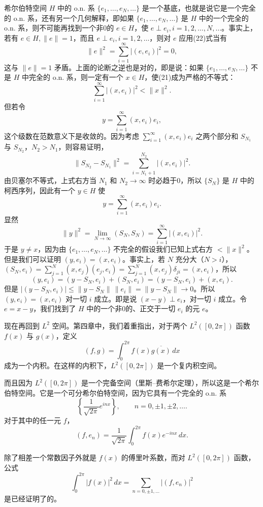 希尔伯特空间 $H$ 中的 o.n. 系 $\{e_1,\ldots,e_N,\ldots\}$ 是一个基底，也就是说它是一个完全的 o.n. 系，还有另一个几何解释，即如果 $\{e_1,\ldots,e_N,\ldots\}$ 是 $H$ 中的一个完全的 o.n. 系，则不可能再找到一个非0的 $e\in H$，使 $e\perp e_i,i=1,2,\ldots,N,\ldots$。事实上，若有 $e\in H,\|e\|=1$，而且 $e\perp e_i,i=1,2,\ldots$，则对 $e$ 应用(22)式当有
\[
 \|e\|^2=\sum_{i=1}^\infty |(e,e_i)|^2=0,
\]
这与 $\|e\|=1$ 矛盾。上面的论断之逆也是对的，即是说：如果 $\{e_1,\ldots,e_N,\ldots\}$ 不是 $H$ 中完全的 o.n. 系，则一定有一个 $x\in H$，使(21)成为严格的不等式：
\[
 \sum_{i=1}^\infty |(x,e_i)|^2<\|x\|^2.
\]
但若令
\[
 y=\sum_{i=1}^\infty(x,e_i)e_i,
\]
这个级数在范数意义下是收敛的。因为考虑 $\sum_{i=1}^\infty(x,e_i)e_i$ 之两个部分和 $S_{N_1}$ 与 $S_{N_2}$，$N_2>N_1$，则容易证明，
\[
 \|S_{N_2}-S_{N_1}\|^2=\sum_{i=N_1+1}^{N_2}|(x,e_i)|^2.
\]
由贝塞尔不等式，上式右方当 $N_1$ 和 $N_2\to\infty$ 时必趋于0，所以 $\{S_N\}$ 是 $H$ 中的柯西序列，因此有一个 $y\in H$ 使
\[
 y=\sum_{i=1}^\infty(x,e_i)e_i.
\]
显然
\[
 \|y\|^2=\lim_{N\to\infty}(S_N,S_N)=\sum_{i=1}^\infty|(x,e_i)|^2.
\]
于是 $y\ne x$，因为由 $\{e_1,\ldots,e_N,\ldots\}$ 不完全的假设我们已知上式右方 $<\|x\|^2$。但是我们可以证明 $(y,e_i)=(x,e_i)$。事实上，若 $N$ 充分大（$N>i$），$(S_N,e_i)=\sum_{j=1}^N(x,e_j)(e_j,e_i)=\sum_{j=1}^N(x,e_j)\delta_{ji}=(x,e_i)$，所以
\[
 (y,e_i)=(y-S_N,e_i)+(S_N,e_i)=(y-S_N,e_i)+(x,e_i).
\]
但是 $|(y-S_N,e_i)|\le\|y-S_N\|\,\|e_i\|=\|y-S_N\|\to0$。所以 $(y,e_i)=(x,e_i)$ 对一切 $i$ 成立。即是说 $(x-y)\perp e_i$，对一切 $i$ 成立。令 $e=x-y$，我们找到了 $H$ 中的一个非0的、正交于一切 $e_i$ 的元 $e$。

现在再回到 $L^2$ 空间。第四章中，我们着重指出，对于两个 $L^2([0,2\pi])$ 函数 $f(x)$ 与 $g(x)$，定义
\begin{equation}
 (f,g)=\int_0^{2\pi}f(x)\overline{g(x)}\,dx
 \tag{23}
\end{equation}
成为一个内积。在这样的内积下，$L^2([0,2\pi])$ 是一个复内积空间。

而且因为 $L^2([0,2\pi])$ 是一个完备空间（里斯--费希尔定理），所以这是一个希尔伯特空间。它是一个可分希尔伯特空间，因为它具有一个完全的 o.n. 系
\[
 \left\{\frac1{\sqrt{2\pi}}e^{inx}\right\},\qquad n=0,\pm1,\pm2,\ldots.
\]
对于其中的任一元 $f$，
\[
 (f,e_n)=\frac1{\sqrt{2\pi}}\int_0^{2\pi}f(x)e^{-inx}\,dx.
\]

除了相差一个常数因子外就是 $f(x)$ 的傅里叶系数，而对 $L^2([0,2\pi])$ 函数，公式
\[
 \int_0^{2\pi}|f(x)|^2\,dx=\sum_{n=0,\pm1,\ldots}|(f,e_n)|^2
\]
是已经证明了的。

